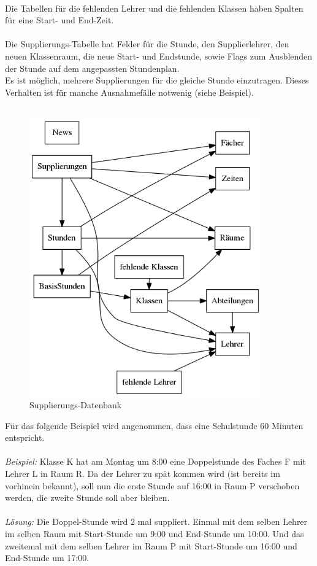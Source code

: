 \\
Die Tabellen für die fehlenden Lehrer und die fehlenden Klassen haben Spalten für eine Start- und End-Zeit.\\
\\
Die Supplierungs-Tabelle hat Felder für die Stunde, den Supplierlehrer, den neuen Klassenraum, die neue Start- und Endstunde, sowie Flags zum Ausblenden der Stunde auf dem angepassten Stundenplan.\\
Es ist möglich, mehrere Supplierungen für die gleiche Stunde einzutragen. Dieses Verhalten ist für manche Ausnahmefälle notwenig (siehe Beispiel).\\
\\
\begin{figure}[H]
\centering
\includegraphics[keepaspectratio=true, width=10cm]{images/dbSubstitudes.png}
\caption{Supplierungs-Datenbank}
\end{figure}
Für das folgende Beispiel wird angenommen, dass eine Schulstunde 60 Minuten entspricht.\\
\\
\textit{Beispiel:} Klasse K hat am Montag um 8:00 eine Doppelstunde des Faches F mit Lehrer L in Raum R. Da der Lehrer zu spät kommen wird (ist bereits im vorhinein bekannt), soll nun die erste Stunde auf 16:00 in Raum P verschoben werden, die zweite Stunde soll aber bleiben.\\
\\
\textit{Lösung:} Die Doppel-Stunde wird 2 mal suppliert. Einmal mit dem selben Lehrer im selben Raum mit Start-Stunde um 9:00 und End-Stunde um 10:00. Und das zweitemal mit dem selben Lehrer im Raum P mit Start-Stunde um 16:00 und End-Stunde um 17:00.

